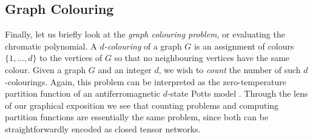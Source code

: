 





\subsection{Graph Colouring}


Finally, let us briefly look at the \emph{graph colouring problem}, or evaluating the chromatic polynomial. A \emph{$d$-colouring} of a graph $G$ is an assignment of colours $\{1, ..., d\}$ to the vertices of $G$ so that no neighbouring vertices have the same colour. Given a graph $G$ and an integer $d$, we wish to \emph{count} the number of such $d$-colourings. Again, this problem can be interpreted as the zero-temperature
partition function of an antiferromagnetic $d$-state Potts model \cite{ChromaticPotts}.
Through the lens of our graphical exposition we see that counting problems and computing partition functions are essentially the same problem, since both can be straightforwardly encoded as closed tensor networks.


